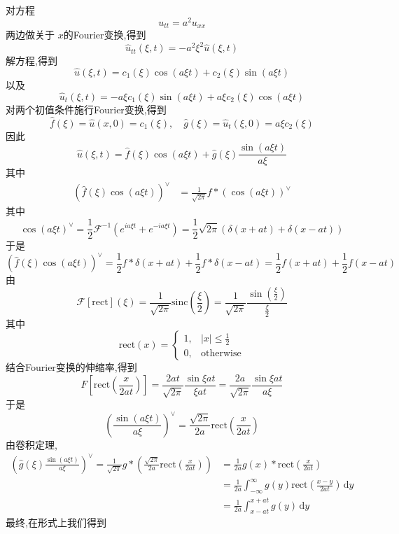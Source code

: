 \documentclass[../../main.tex]{subfiles}
\begin{document}
对方程 \[
u_{tt} = a^{2}u_{xx}
\]两边做关于 \(  x  \)的Fourier变换,得到  \[
\hat{u}_{tt}\left(  \xi  ,t\right) = -a^{2} \xi ^{2}\hat{u}\left(  \xi,t  \right) 
\]解方程,得到 \[
\hat{u}\left(  \xi ,t \right)= c_1\left(  \xi  \right)\cos \left( a \xi t \right)+ c_2\left(  \xi  \right)\sin \left( a \xi t \right)     
\]以及 \[
\hat{u}_{t}\left(  \xi ,t \right)= -a \xi c_1\left(  \xi  \right)\sin \left( a \xi t \right)+ a \xi c_2\left(  \xi  \right)\cos \left( a \xi t \right)     
\]对两个初值条件施行Fourier变换,得到 \[
\hat{f}\left(  \xi  \right)= \hat{u}\left( x,0 \right)= c_1\left(  \xi  \right),\quad \hat{g}\left(  \xi  \right)= \hat{u}_{t}\left(  \xi ,0 \right)= a \xi c_2\left(  \xi  \right)       
\]因此 \[
\hat{u}\left(  \xi ,t \right)= \hat{f}\left(  \xi  \right)  \cos \left( a \xi t \right)+ \hat{g}\left(  \xi  \right)  \frac{\sin \left( a \xi t \right)  }{a \xi  }  
\]其中 \[
\begin{aligned}
\left( \hat{f}\left(  \xi  \right)\cos \left( a \xi t \right)   \right)^{\vee }&=\frac{1 }{\sqrt{2\pi } }f*\left( \cos \left( a \xi t \right)  \right)^{\vee }     
\end{aligned}
\]其中 \[
\cos \left( a \xi t \right)^{\vee }=\frac{1}{2} \mathcal{F}^{-1} \left( e^{ia \xi t}+ e^{-ia \xi t} \right)=  \frac{1}{2}\sqrt{2\pi }\left(  \delta \left( x+ at \right)+  \delta \left( x-at \right)   \right) 
\]于是 \[
\left( \hat{f}\left(  \xi  \right)\cos \left( a \xi t \right)   \right)^{\vee } = \frac{1}{2}f* \delta \left( x+ at \right)+ \frac{1}{2}f* \delta \left( x-at \right)=    \frac{1}{2}f\left( x+ at \right)+ \frac{1}{2}f\left( x-at \right)  
\]
由  \[
\mathcal{F}\left[ \mathrm{rect} \right]\left(  \xi  \right)= \frac{1 }{\sqrt{2\pi } } \mathrm{sinc}\left( \frac{ \xi  }{2 }  \right)= \frac{1 }{\sqrt{2\pi } }\frac{\sin \left( \frac{ \xi  }{2 }  \right)  }{\frac{ \xi  }{2 }  }     
\]其中 \[
\mathrm{rect}\left( x \right)= \begin{cases} 1,& \left| x \right|\le \frac{1}{2} \\ 
 0,& \text{otherwise} \end{cases}  
\]结合Fourier变换的伸缩率,得到 \[
F\left[ \mathrm{rect}\left( \frac{x }{2at }  \right)  \right]= \frac{2at }{\sqrt{2\pi } }\frac{\sin  \xi at }{ \xi at }   = \frac{2a }{\sqrt{2\pi } }\frac{\sin  \xi at }{ a\xi  }  
\]于是 \[
\left( \frac{\sin \left( a \xi t \right)  }{a \xi  }  \right)^{\vee }=\frac{\sqrt{2\pi } }{2a } \mathrm{rect}\left( \frac{x }{2at }  \right)   
\]由卷积定理, \[
\begin{aligned}
\left( \hat{g}\left(  \xi  \right) \frac{\sin \left( a \xi t \right)  }{a \xi  }   \right)^{\vee }= \frac{1 }{\sqrt{2\pi } }g*\left( \frac{\sqrt{2\pi } }{2a } \mathrm{rect}\left( \frac{x }{2at }  \right)   \right)&= \frac{1 }{2a }g\left( x \right) * \mathrm{rect}\left( \frac{x }{2at }  \right)     \\ 
 &= \frac{1 }{2a } \int_{-\infty}^{\infty}g\left( y \right)  \mathrm{rect}\left( \frac{x-y }{2at }  \right)\,\mathrm{d} y\\ 
  &= \frac{1 }{2a } \int_{x-at}^{x+ at}g\left( y \right)\,\mathrm{d} y   
\end{aligned}
\]最终,在形式上我们得到
\end{document}
